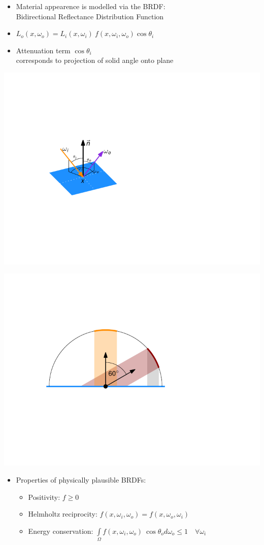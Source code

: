 \documentclass[utf8,stillsansserifmath,fleqn,t]{beamer}
\begin{document}
\begin{frame}[label=materials-1]
\frametitle{\insertsection}
\begin{itemize}
\item Material appearence is modelled via the BRDF:\\
Bidirectional Reflectance Distribution Function
\item $L_o(x, \omega_o) = L_i(x,\omega_i)~f(x,\omega_i,\omega_o)\cos\theta_i$
\item Attenuation term $\cos\theta_i$\\
corresponds to projection of solid angle onto plane
\end{itemize}
\begin{minipage}{.49\textwidth}
\centerline{\includegraphics[width=.7\textwidth]{./fig/brdf.pdf}}
\end{minipage}\hfill
\begin{minipage}{.49\textwidth}
\centerline{\includegraphics[width=.7\textwidth]{./fig/attenuation-cos-theta.pdf}}
\end{minipage}
\begin{itemize}
\item Properties of physically plausible BRDFs:
\begin{itemize}
\item Positivity: $f \geq 0$
\item Helmholtz reciprocity:
    $f(x,\omega_i,\omega_o) = f(x,\omega_o,\omega_i)$
\item Energy conservation:
    $\int\limits_\Omega
    f(x,\omega_i,\omega_o)~\cos{\theta_o} d\omega_o \le
    1\quad\forall\omega_i$
\end{itemize}
\end{itemize}
\end{frame}
\end{document}
